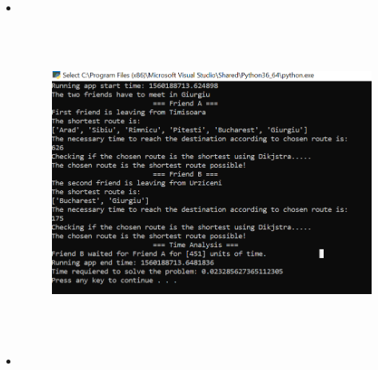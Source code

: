 \documentclass[12pt]{article}
\begin{document}
\begin{itemize}

	\item \ \  \par




\begin{figure}[H]
	\begin{Center}
		\includegraphics[width=5.82in,height=4.06in]{./media/image5.png}
	\end{Center}
\end{figure}



	\item \par





\end{itemize}
\end{document}
